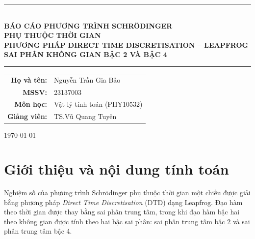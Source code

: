 \documentclass[12pt,a4paper]{article}
\begin{document}
\begin{titlepage}
    \centering
    \vspace*{1.6cm}

    \rule{\textwidth}{1pt} \\[0.5cm]
    {\huge \textbf{BÁO CÁO PHƯƠNG TRÌNH SCHRÖDINGER}} \\[0.35cm]
    {\Large \textbf{PHỤ THUỘC THỜI GIAN}} \\[0.35cm]
    {\large \textbf{PHƯƠNG PHÁP DIRECT TIME DISCRETISATION -- LEAPFROG}} \\[0.2cm]
    {\large \textbf{SAI PHÂN KHÔNG GIAN BẬC 2 VÀ BẬC 4}} \\[0.2cm]
    \rule{\textwidth}{1pt}

    \vspace{2cm}

    {\large
    \begin{tabular}{rl}
        \textbf{Họ và tên:}  & Nguyễn Trần Gia Bảo \\[4pt]
        \textbf{MSSV:}       & 23137003 \\[4pt]
        \textbf{Môn học:}    & Vật lý tính toán (PHY10532) \\[4pt]
        \textbf{Giảng viên:} & TS.\@ Vũ Quang Tuyên \\
    \end{tabular}
    }

    \vfill
    {\large \today}
\end{titlepage}

\newpage
\tableofcontents
\newpage

\section{Giới thiệu và nội dung tính toán}

Nghiệm số của phương trình Schrödinger phụ thuộc thời gian một chiều được giải bằng phương pháp \textit{Direct Time Discretisation} (DTD) dạng Leapfrog. Đạo hàm theo thời gian được thay bằng sai phân trung tâm, trong khi đạo hàm bậc hai theo không gian được tính theo hai bậc sai phân: sai phân trung tâm bậc 2 và sai phân trung tâm bậc 4.
\end{document}
